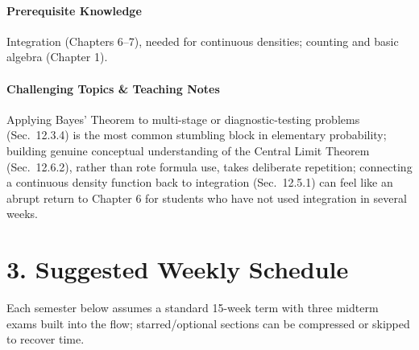 \documentclass[11pt]{article}
\newcommand{\PreReq}{\paragraph{Prerequisite Knowledge}}
\newcommand{\Hard}{\paragraph{Challenging Topics \& Teaching Notes}}
\begin{document}
\PreReq Integration (Chapters 6--7), needed for continuous densities; counting and basic algebra (Chapter 1).

\Hard Applying Bayes' Theorem to multi-stage or diagnostic-testing
problems (Sec.\ 12.3.4) is the most common stumbling block in elementary
probability; building genuine conceptual understanding of the Central
Limit Theorem (Sec.\ 12.6.2), rather than rote formula use, takes
deliberate repetition; connecting a continuous density function back to
integration (Sec.\ 12.5.1) can feel like an abrupt return to Chapter 6 for
students who have not used integration in several weeks.

\newpage
\section*{3. Suggested Weekly Schedule}

Each semester below assumes a standard 15-week term with three midterm
exams built into the flow; starred/optional sections can be compressed or
skipped to recover time.
\end{document}
